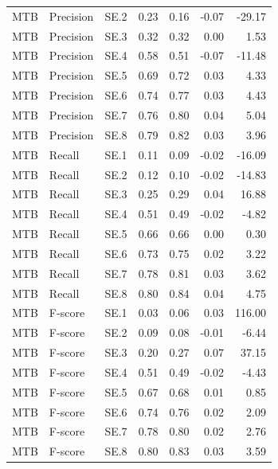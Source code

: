\begin{tabular}{lllrrrr}
MTB & Precision & SE.2 & 0.23 & 0.16 & -0.07 & -29.17 \\
MTB & Precision & SE.3 & 0.32 & 0.32 & 0.00 & 1.53 \\
MTB & Precision & SE.4 & 0.58 & 0.51 & -0.07 & -11.48 \\
MTB & Precision & SE.5 & 0.69 & 0.72 & 0.03 & 4.33 \\
MTB & Precision & SE.6 & 0.74 & 0.77 & 0.03 & 4.43 \\
MTB & Precision & SE.7 & 0.76 & 0.80 & 0.04 & 5.04 \\
MTB & Precision & SE.8 & 0.79 & 0.82 & 0.03 & 3.96 \\
MTB & Recall & SE.1 & 0.11 & 0.09 & -0.02 & -16.09 \\
MTB & Recall & SE.2 & 0.12 & 0.10 & -0.02 & -14.83 \\
MTB & Recall & SE.3 & 0.25 & 0.29 & 0.04 & 16.88 \\
MTB & Recall & SE.4 & 0.51 & 0.49 & -0.02 & -4.82 \\
MTB & Recall & SE.5 & 0.66 & 0.66 & 0.00 & 0.30 \\
MTB & Recall & SE.6 & 0.73 & 0.75 & 0.02 & 3.22 \\
MTB & Recall & SE.7 & 0.78 & 0.81 & 0.03 & 3.62 \\
MTB & Recall & SE.8 & 0.80 & 0.84 & 0.04 & 4.75 \\
MTB & F-score & SE.1 & 0.03 & 0.06 & 0.03 & 116.00 \\
MTB & F-score & SE.2 & 0.09 & 0.08 & -0.01 & -6.44 \\
MTB & F-score & SE.3 & 0.20 & 0.27 & 0.07 & 37.15 \\
MTB & F-score & SE.4 & 0.51 & 0.49 & -0.02 & -4.43 \\
MTB & F-score & SE.5 & 0.67 & 0.68 & 0.01 & 0.85 \\
MTB & F-score & SE.6 & 0.74 & 0.76 & 0.02 & 2.09 \\
MTB & F-score & SE.7 & 0.78 & 0.80 & 0.02 & 2.76 \\
MTB & F-score & SE.8 & 0.80 & 0.83 & 0.03 & 3.59 \\
\bottomrule
\end{tabular}
